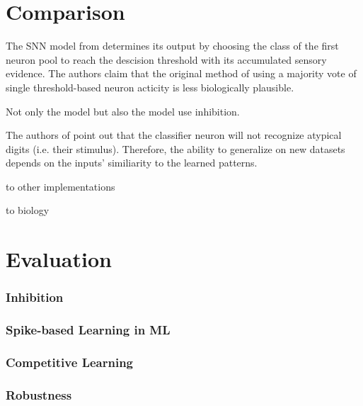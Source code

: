 \section{Comparison}
\label{sec:comparison}

The \ac{SNN} model from \cite{STDP_like} determines its output by 
choosing the class of the first neuron pool to reach the descision threshold with its accumulated sensory evidence.
The authors claim that the original method of using a majority vote of single threshold-based neuron acticity is less biologically plausible.

Not only the \cite{STDP_like} model but also the \cite{SNN} model use inhibition.

The authors of \cite{STDP_like} point out that the classifier neuron will not recognize atypical digits (i.e. their stimulus).
Therefore, the ability to generalize on new datasets depends on the inputs' similiarity to the learned patterns.

to other implementations

to biology


\section{Evaluation}
\label{sec:evaluation}

\subsubsection{Inhibition}

\subsubsection{Spike-based Learning in ML}

\subsubsection{Competitive Learning}

\subsubsection{Robustness}